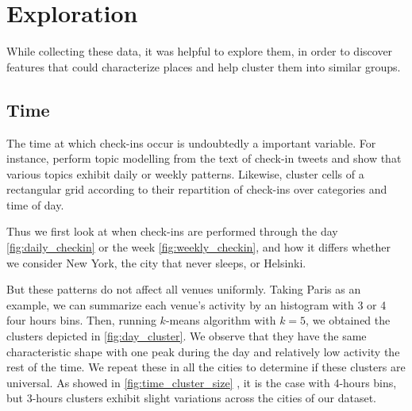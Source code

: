\section{Exploration}
\label{sec:exploration}

While collecting these data, it was helpful to explore them, in order to
discover features that could characterize places and help cluster them into
similar groups.

\subsection{Time}

The time at which check-ins occur is undoubtedly a important variable. For
instance, \textcite{UrbanStory12} perform topic modelling from the text of
check-in tweets and show that various topics exhibit daily or weekly
patterns. Likewise, \textcite{TimeCluster13} cluster cells of a rectangular
grid according to their repartition of check-ins over categories and time of
day.

Thus we first look at when check-ins are performed through the day
\autoref{fig:daily_checkin} or the week \autoref{fig:weekly_checkin}, and how it
differs whether we consider New York, the city that never sleeps, or Helsinki.

But these patterns do not affect all venues uniformly. Taking Paris as an
example, we can summarize each venue's activity by an histogram with 3 or 4
four hours bins. Then, running $k$-means algorithm with $k=5$, we obtained the
clusters depicted in \autoref{fig:day_cluster}. We observe that they have the
same characteristic shape with one peak during the day and relatively low
activity the rest of the time. We repeat these in all the cities to determine
if these clusters are universal. As showed in \autoref{fig:time_cluster_size}
, it is the case with 4-hours bins, but
3-hours clusters exhibit slight variations across the cities of our dataset.

